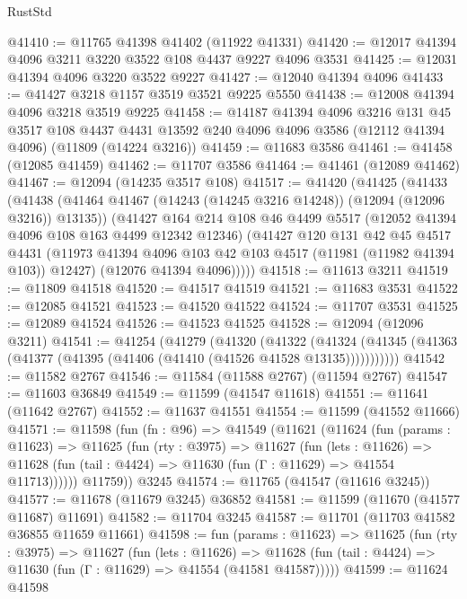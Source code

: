 \begin{lexlean}{RustStd}
\begin{coremodule}
@41410 := @11765 @41398 @41402 (@11922 @41331)
@41420 := @12017 @41394 @4096 @3211 @3220 @3522 @108 @4437 @9227 @4096 @3531
@41425 := @12031 @41394 @4096 @3220 @3522 @9227
@41427 := @12040 @41394 @4096
@41433 := @41427 @3218 @1157 @3519 @3521 @9225 @5550
@41438 := @12008 @41394 @4096 @3218 @3519 @9225
@41458 := @14187
    @41394
    @4096
    @3216
    @131
    @45
    @3517
    @108
    @4437
    @4431
    @13592
    @240
    @4096
    @4096
    @3586
    (@12112 @41394 @4096)
    (@11809 (@14224 @3216))
@41459 := @11683 @3586
@41461 := @41458 (@12085 @41459)
@41462 := @11707 @3586
@41464 := @41461 (@12089 @41462)
@41467 := @12094 (@14235 @3517 @108)
@41517 := @41420
    (@41425
      (@41433
        (@41438 (@41464 @41467 (@14243 (@14245 @3216 @14248)) (@12094 (@12096 @3216)) @13135))
        (@41427
          @164
          @214
          @108
          @46
          @4499
          @5517
          (@12052 @41394 @4096 @108 @163 @4499 @12342 @12346)
          (@41427
            @120
            @131
            @42
            @45
            @4517
            @4431
            (@11973 @41394 @4096 @103 @42 @103 @4517 (@11981 (@11982 @41394 @103)) @12427)
            (@12076 @41394 @4096)))))
@41518 := @11613 @3211
@41519 := @11809 @41518
@41520 := @41517 @41519
@41521 := @11683 @3531
@41522 := @12085 @41521
@41523 := @41520 @41522
@41524 := @11707 @3531
@41525 := @12089 @41524
@41526 := @41523 @41525
@41528 := @12094 (@12096 @3211)
@41541 := @41254
    (@41279
      (@41320
        (@41322
          (@41324 (@41345 (@41363 (@41377 (@41395 (@41406 (@41410 (@41526 @41528 @13135)))))))))))
@41542 := @11582 @2767
@41546 := @11584 (@11588 @2767) (@11594 @2767)
@41547 := @11603 @36849
@41549 := @11599 (@41547 @11618)
@41551 := @11641 (@11642 @2767)
@41552 := @11637 @41551
@41554 := @11599 (@41552 @11666)
@41571 := @11598
    (fun (fn : @96) =>
    @41549
      (@11621
        (@11624
          (fun (params : @11623) =>
          @11625
            (fun (rty : @3975) =>
            @11627
              (fun (lets : @11626) =>
              @11628 (fun (tail : @4424) => @11630 (fun (Γ : @11629) => @41554 @11713))))))
        @11759))
    @3245
@41574 := @11765 (@41547 (@11616 @3245))
@41577 := @11678 (@11679 @3245) @36852
@41581 := @11599 (@11670 (@41577 @11687) @11691)
@41582 := @11704 @3245
@41587 := @11701 (@11703 @41582 @36855 @11659 @11661)
@41598 := fun (params : @11623) =>
  @11625
    (fun (rty : @3975) =>
    @11627
      (fun (lets : @11626) =>
      @11628 (fun (tail : @4424) => @11630 (fun (Γ : @11629) => @41554 (@41581 @41587)))))
@41599 := @11624 @41598

\end{coremodule}
\end{lexlean}

